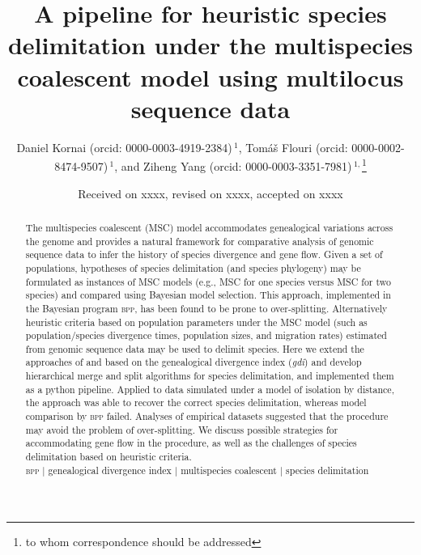 \documentclass[A4]{article1}
\begin{document}
\title[Heuristic species delimitation] {A pipeline for heuristic species delimitation
   under the multispecies coalescent model using multilocus sequence data}

\author[
	Kornai \textit{et~al.}]{Daniel Kornai (orcid: 0000-0003-4919-2384)\,$^{1}$, 
	Tom\'{a}\v{s} Flouri (orcid: 0000-0002-8474-9507)\,$^{1}$, and
	Ziheng Yang (orcid: 0000-0003-3351-7981)\,$^{1,}$\footnote{to whom correspondence should be addressed}}

\address{
	$^1$Department of Genetics, Evolution and Environment, University College London, UK \\
}

\date{Received on xxxx, revised on xxxx, accepted on xxxx}


\begin{abstract}
The multispecies coalescent (MSC) model accommodates genealogical variations across
the genome and provides a natural framework for comparative analysis of genomic
sequence data to infer the history of species divergence and gene flow.  Given a set
of populations, hypotheses of species delimitation (and species phylogeny) may be
formulated as instances of MSC models (e.g., MSC for one species versus MSC for two
species) and compared using Bayesian model selection. This approach, implemented in
the Bayesian program \textsc{bpp}, has been found to be prone to over-splitting.
Alternatively heuristic criteria based on population parameters under the MSC model
(such as population/species divergence times, population sizes, and migration rates)
estimated from genomic sequence data may be used to delimit species.  Here we extend
the approaches of \cite{Jackson2017} and \cite{Leache2019} based on the genealogical
divergence index (\textit{gdi}) and develop hierarchical merge and split algorithms
for species delimitation, and implemented them as a python pipeline.  Applied to
data simulated under a model of isolation by distance, the approach was able to
recover the correct species delimitation, whereas model comparison by \textsc{bpp}
failed.  Analyses of empirical datasets suggested that the procedure may avoid the
problem of over-splitting.  We discuss possible strategies for accommodating gene
flow in the procedure, as well as the challenges of species delimitation based on
heuristic criteria. \\ %
\textsc{bpp} $|$ genealogical divergence index $|$ multispecies coalescent $|$
species delimitation
\end{abstract}

\maketitle
\end{document}
